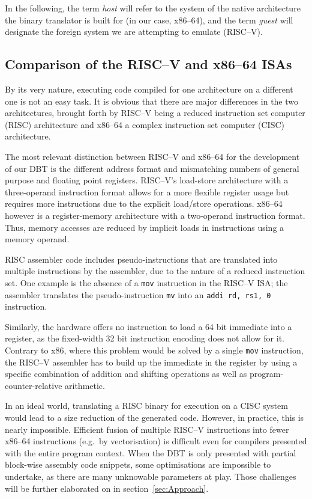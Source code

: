 In the following, the term \textit{host} will refer to the system of the native architecture the binary translator is built for (in our case, x86--64), and the term \textit{guest} will designate the foreign system we are attempting to emulate (RISC--V).

\subsection{Comparison of the RISC--V and x86--64 ISAs}
\label{sec:isa-cmp}
By its very nature, executing code compiled for one architecture on a different one is not an easy task.
It is obvious that there are major differences in the two architectures, brought forth by RISC--V being a reduced instruction set computer (RISC) architecture and x86--64 a complex instruction set computer (CISC) architecture.

The most relevant distinction between RISC--V and x86--64 for the development of our DBT is the different address format and mismatching numbers of general purpose and floating point registers.
RISC--V's load-store architecture with a three-operand instruction format allows for a more flexible register usage but requires more instructions due to the explicit load/store operations.
x86--64 however is a register-memory architecture with a two-operand instruction format.
Thus, memory accesses are reduced by implicit loads in instructions using a memory operand.

RISC assembler code includes pseudo-instructions that are translated into multiple instructions by the assembler, due to the nature of a reduced instruction set.
One example is the absence of a \texttt{mov} instruction in the RISC--V ISA\@; the assembler translates the pseudo-instruction \texttt{mv} into an \texttt{addi rd, rs1, 0} instruction.

Similarly, the hardware offers no instruction to load a 64 bit immediate into a register, as the fixed-width 32 bit instruction encoding does not allow for it.
Contrary to x86, where this problem would be solved by a single \texttt{mov} instruction, the RISC--V assembler has to build up the immediate in the register by using a specific combination of addition and shifting operations as well as program-counter-relative arithmetic.

In an ideal world, translating a RISC binary for execution on a CISC system would lead to a size reduction of the generated code.
However, in practice, this is nearly impossible.
Efficient fusion of multiple RISC--V instructions into fewer x86--64 instructions (e.g.\ by vectorisation) is difficult even for compilers presented with the entire program context.
When the DBT is only presented with partial block-wise assembly code snippets, some optimisations are impossible to undertake, as there are many unknowable parameters at play.
Those challenges will be further elaborated on in section~\ref{sec:Approach}.

